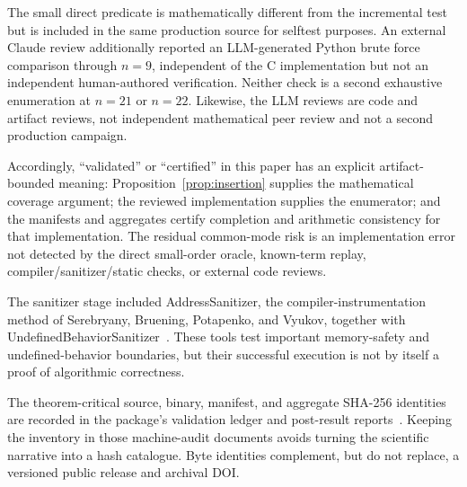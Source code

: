 \documentclass[11pt]{article}
\theoremstyle{definition}
\theoremstyle{remark}
\begin{document}
The small direct predicate is mathematically different from the incremental
test but is included in the same production source for selftest purposes.
An external Claude review additionally reported an LLM-generated Python brute
force comparison through $n=9$, independent of the C implementation but not
an independent human-authored verification.  Neither check is a second
exhaustive enumeration at $n=21$ or $n=22$.  Likewise, the LLM reviews are
code and artifact reviews, not independent mathematical peer review and not
a second production campaign.

Accordingly, ``validated'' or ``certified'' in this paper has an explicit
artifact-bounded meaning: Proposition~\ref{prop:insertion} supplies the
mathematical coverage argument; the reviewed implementation supplies the
enumerator; and the manifests and aggregates certify completion and arithmetic
consistency for that implementation.  The residual common-mode risk is an
implementation error not detected by the direct small-order oracle, known-term
replay, compiler/sanitizer/static checks, or external code reviews.

The sanitizer stage included AddressSanitizer, the compiler-instrumentation
method of Serebryany, Bruening, Potapenko, and Vyukov, together with
UndefinedBehaviorSanitizer~\cite{serebryany2012}.  These tools test important
memory-safety and undefined-behavior boundaries, but their successful execution
is not by itself a proof of algorithmic correctness.

The theorem-critical source, binary, manifest, and aggregate SHA-256
identities are recorded in the package's validation ledger and post-result
reports~\cite{cortiA369431Package2026}.  Keeping the inventory in those
machine-audit documents avoids turning the scientific narrative into a hash
catalogue.  Byte identities complement, but do not replace, a versioned
public release and archival DOI.
\end{document}
